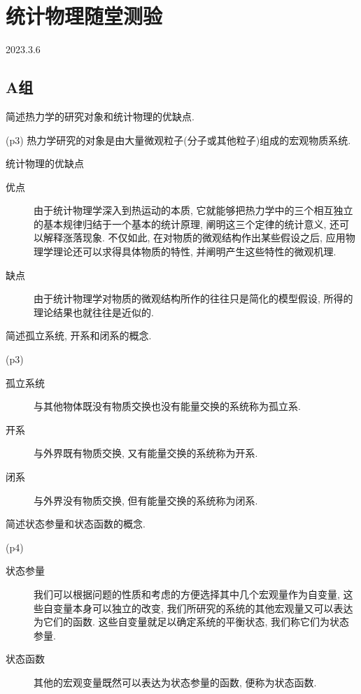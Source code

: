 \section{统计物理随堂测验}
2023.3.6
\subsection{A组}
\begin{questions}
  \question 简述热力学的研究对象和统计物理的优缺点.
  \begin{solution}
    (p3)
    热力学研究的对象是由大量微观粒子(分子或其他粒子)组成的宏观物质系统.

    统计物理的优缺点
    \begin{description}
      \item[优点] 由于统计物理学深入到热运动的本质, 它就能够把热力学中的三个相互独立的基本规律归结于一个基本的统计原理, 阐明这三个定律的统计意义, 还可以解释涨落现象. 不仅如此, 在对物质的微观结构作出某些假设之后, 应用物理学理论还可以求得具体物质的特性, 并阐明产生这些特性的微观机理.
      \item[缺点] 由于统计物理学对物质的微观结构所作的往往只是简化的模型假设, 所得的理论结果也就往往是近似的.
    \end{description}
  \end{solution}
  \question 简述孤立系统, 开系和闭系的概念.
  \begin{solution}
    (p3)
    \begin{description}
      \item[孤立系统] 与其他物体既没有物质交换也没有能量交换的系统称为孤立系.
      \item[开系] 与外界既有物质交换, 又有能量交换的系统称为开系.
      \item[闭系] 与外界没有物质交换, 但有能量交换的系统称为闭系.
    \end{description}
  \end{solution}
  \question 简述状态参量和状态函数的概念.
  \begin{solution}
    (p4)
    \begin{description}
      \item[状态参量]  我们可以根据问题的性质和考虑的方便选择其中几个宏观量作为自变量, 这些自变量本身可以独立的改变, 我们所研究的系统的其他宏观量又可以表达为它们的函数. 这些自变量就足以确定系统的平衡状态, 我们称它们为状态参量.
      \item[状态函数] 其他的宏观变量既然可以表达为状态参量的函数, 便称为状态函数.
    \end{description}
  \end{solution}

\end{questions}
